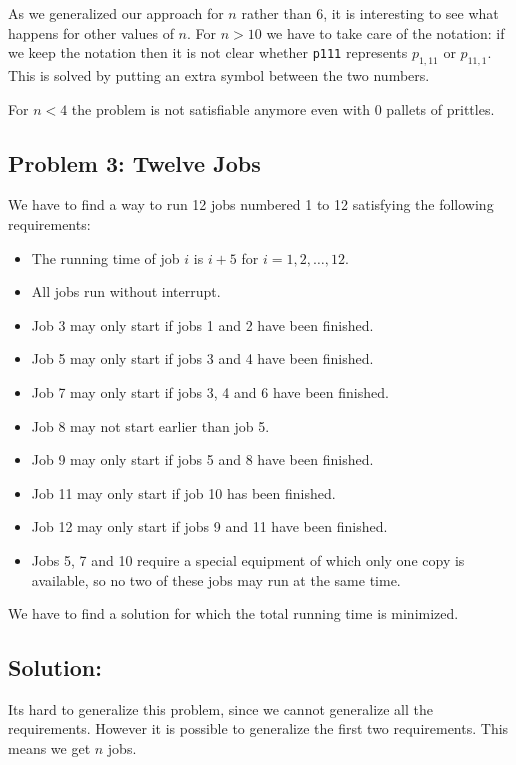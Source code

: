 \documentclass[12pt]{article}
\begin{document}
\noindent As we generalized our approach for $n$ rather than 6, it is
interesting to see what happens for other values of $n$. For $n
> 10$ we have to take care of the notation: if we keep the
notation then it is not clear whether {\tt p111} represents
$p_{1,11}$ or $p_{11,1}$. This is solved by putting an extra
symbol between the two numbers.

For $n < 4$ the problem is not satisfiable anymore even with 0 pallets of prittles.

\subsection*{Problem 3: Twelve Jobs}

We have to find a way to run 12 jobs numbered 1 to 12 satisfying the following requirements:
\begin{itemize}
\item The running time of job $i$ is $i+5$ for $i = 1,2, \ldots ,12.$
\item All jobs run without interrupt.
\item Job 3 may only start if jobs 1 and 2 have been finished.
\item Job 5 may only start if jobs 3 and 4 have been finished.
\item Job 7 may only start if jobs 3, 4 and 6 have been finished.
\item Job 8 may not start earlier than job 5.
\item Job 9 may only start if jobs 5 and 8 have been finished.
\item Job 11 may only start if job 10 has been finished.
\item Job 12 may only start if jobs 9 and 11 have been finished.
\item Jobs 5, 7 and 10 require a special equipment of which only one copy is available, so no two of these jobs may run at the same time.
\end{itemize}
We have to find a solution for which the total running time is minimized.

\vspace{8mm}

\subsection*{Solution:}
Its hard to generalize this problem, since we cannot generalize all the requirements. However it is possible to generalize the first two requirements. This means we get $n$ jobs.
\end{document}
